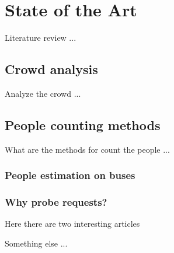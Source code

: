 \chapter{State of the Art}
\label{cha:soa}
\vspace{0.5 cm} 

Literature review ...


\vspace{0.5 cm} 
\section{Crowd analysis}
\label{sec:crowd}
\vspace{0.5 cm} 

Analyze the crowd ...


\vspace{0.5 cm} 
\section{People counting methods}
\label{sec:count}
\vspace{0.5 cm} 

What are the methods for count the people ...


\vspace{0.5 cm} 
\subsection{People estimation on buses}
\label{sec:bus}
\vspace{0.5 cm}


\vspace{0.5 cm} 
\subsection{Why probe requests?}
\label{sec:bus}
\vspace{0.5 cm}

Here there are two interesting articles
\cite{mikkelsen2016public}
\cite{mehmood2019occupancy}


Something else ...
\cite{nishide2019filter}
